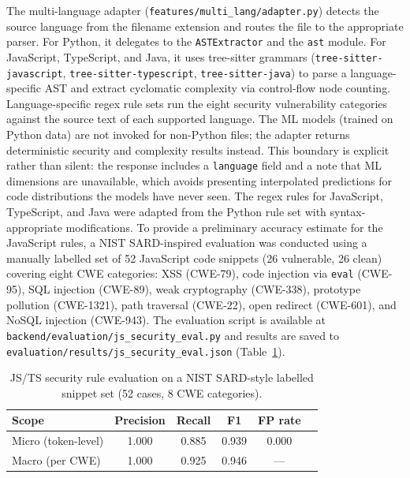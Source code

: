 \documentclass[12pt, oneside]{report}
\begin{document}
The multi-language adapter (\texttt{features/multi\_lang/adapter.py}) detects the source
language from the filename extension and routes the file to the appropriate parser.
For Python, it delegates to the \texttt{ASTExtractor} and the \texttt{ast} module.
For JavaScript, TypeScript, and Java, it uses tree-sitter grammars
(\texttt{tree-sitter-javascript}, \texttt{tree-sitter-typescript},
\texttt{tree-sitter-java}) to parse a language-specific AST and extract cyclomatic
complexity via control-flow node counting. Language-specific regex rule sets run the
eight security vulnerability categories against the source text of each supported language.
The ML models (trained on Python data) are not invoked for non-Python files;
the adapter returns deterministic security and complexity results instead. This
boundary is explicit rather than silent: the response includes a \texttt{language}
field and a note that ML dimensions are unavailable, which avoids presenting
interpolated predictions for code distributions the models have never seen.
The regex rules for JavaScript, TypeScript, and Java were adapted from the Python
rule set with syntax-appropriate modifications. To provide a preliminary accuracy
estimate for the JavaScript rules, a NIST SARD-inspired evaluation was conducted
using a manually labelled set of 52 JavaScript code snippets (26 vulnerable, 26
clean) covering eight CWE categories: XSS (CWE-79), code injection via
\texttt{eval} (CWE-95), SQL injection (CWE-89), weak cryptography (CWE-338),
prototype pollution (CWE-1321), path traversal (CWE-22), open redirect (CWE-601),
and NoSQL injection (CWE-943). The evaluation script is available at
\texttt{backend/evaluation/js\_security\_eval.py} and results are saved to
\texttt{evaluation/results/js\_security\_eval.json} (Table~\ref{tab:js-security-eval}).

\begin{table}[H]
\centering
\small
\caption{JS/TS security rule evaluation on a NIST SARD-style labelled snippet set (52 cases, 8 CWE categories).}
\label{tab:js-security-eval}
\begin{tabular}{lccccc}
\hline
\textbf{Scope} & \textbf{Precision} & \textbf{Recall} & \textbf{F1} & \textbf{FP rate} \\
\hline
Micro (token-level) & 1.000 & 0.885 & 0.939 & 0.000 \\
Macro (per CWE)     & 1.000 & 0.925 & 0.946 & --- \\
\hline
\end{tabular}
\end{table}
\end{document}
